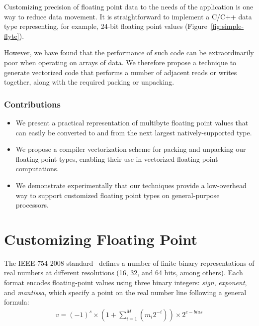 \documentclass{sig-alternate-05-2015}
\begin{document}
Customizing precision of floating point data to the needs of the application is
one way to reduce data movement. It is straightforward to implement a C/C++
data type representing, for example, 24-bit floating point values
(Figure~\ref{fig:simple-flyte}).

However, we have found that the performance of such code can be extraordinarily
poor when operating on arrays of data. We therefore propose a technique to
generate vectorized code that performs a number of adjacent reads or writes
together, along with the required packing or unpacking.



\subsubsection*{Contributions}

\begin{itemize}

\item We present a practical representation of multibyte floating
  point values that can easily be converted to and from the next
  largest natively-supported type.

\item We propose a compiler vectorization scheme for packing and
  unpacking our floating point types, enabling their use in vectorized floating
  point computations.





\item We demonstrate experimentally that our techniques provide a low-overhead
way to support customized floating point types on general-purpose processors.

\end{itemize}

















\section{Customizing Floating Point}
\label{sec:ieee-754-intro}

The IEEE-754 2008 standard~\cite{zuras2008ieee} defines a number of finite
binary representations of real numbers at different resolutions (16, 32, and 64
bits, among others). Each format encodes floating-point values using three
binary integers: \emph{sign}, \emph{exponent}, and \emph{mantissa}, which
specify a point on the real number line following a general formula:
\begin{align*}
v = (-1)^{s} \times (1 + \sum_{i=1}^{M}(m_{i}2^{-i})) \times 2^{e-bias}
\end{align*}
\end{document}
